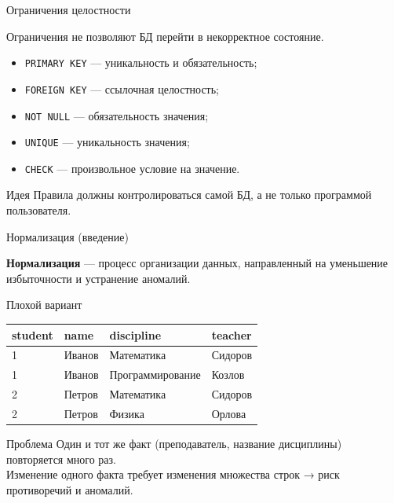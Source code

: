 \documentclass[aspectratio=169]{beamer}
\begin{document}
\begin{frame}{Ограничения целостности}

Ограничения не позволяют БД
перейти в некорректное состояние.

\vspace{0.4cm}

\begin{itemize}
  \item \texttt{PRIMARY KEY} — уникальность и обязательность;
  \item \texttt{FOREIGN KEY} — ссылочная целостность;
  \item \texttt{NOT NULL} — обязательность значения;
  \item \texttt{UNIQUE} — уникальность значения;
  \item \texttt{CHECK} — произвольное условие на значение.
\end{itemize}

\vspace{0.3cm}

\begin{alertblock}{Идея}
Правила должны контролироваться самой БД,
а не только программой пользователя.
\end{alertblock}

\end{frame}


\begin{frame}{Нормализация (введение)}

\textbf{Нормализация} — процесс организации данных,
направленный на уменьшение избыточности
и устранение аномалий.

\vspace{0.1cm}

\begin{alertblock}{Плохой вариант}
\begin{center}
\begin{tabular}{|l|l|l|l|}
\hline
\textbf{student} & \textbf{name} & \textbf{discipline} & \textbf{teacher} \\
\hline
1 & Иванов & Математика & Сидоров \\
1 & Иванов & Программирование & Козлов \\
2 & Петров & Математика & Сидоров \\
2 & Петров & Физика & Орлова \\
\hline
\end{tabular}
\end{center}
\end{alertblock}

\vspace{-0.3cm}

\begin{block}{Проблема}
Один и тот же факт (преподаватель, название дисциплины) повторяется много раз.\\[0.2cm]
Изменение одного факта требует изменения множества строк → риск противоречий и аномалий.
\end{block}

\end{frame}
\end{document}
